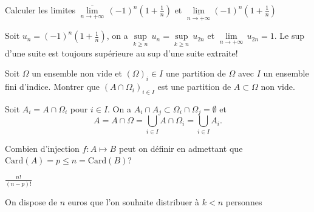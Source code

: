 \documentclass[11pt, answers]{exam}
\def \Z{\mathbb Z}
\newcommand{\RL}{\mathbb{R}}
\def \limsup{\underset{n\rightarrow+\infty}{\overline{\lim}}}
\def \liminf{\underset{n\rightarrow+\infty}{\underline{\lim}}}
\begin{document}
\begin{questions}
\question Calculer les limites  $\limsup\, (-1)^n\left(1+\frac{1}{n}\right)$ et $\liminf (-1)^n\left(1+\frac{1}{n}\right)$
\begin{solution}
Soit $u_n = (-1)^n\left(1+\frac{1}{n}\right)$, on a $\underset{k\geq n}{\sup}\,u_n  =\underset{k\geq n}{\sup}\,u_{2n}$ et $\underset{n\rightarrow +\infty}{\lim}\,u_{2n} = 1$. Le sup d'une suite est toujours supérieure au sup d'une suite extraite!
\end{solution}
\question Soit $\Omega$ un ensemble non vide et $(\Omega)_i\in I$ une partition de $\Omega$ avec $I$ un ensemble fini d'indice. Montrer que $(A\cap \Omega_i)_{i\in I}$ est une partition de $A\subset \Omega$ non vide. 
\begin{solution}
Soit $A_i = A\cap \Omega_i$ pour $i\in I$. On a $A_i\cap A_j\subset \Omega_i\cap \Omega_j = \emptyset$ et 
$$
A = A\cap\Omega = \bigcup_{i\in I}A\cap\Omega_i = \bigcup_{i\in I}A_i. 
$$
\end{solution}
\question Combien d'injection $f:A\mapsto B$ peut on définir en admettant que $\text{Card}(A) = p \leq n =\text{Card}(B)$? 
\begin{solution}
$\frac{n!}{(n-p)!}$
\end{solution}
\question On dispose de $n$ euros que l'on souhaite distribuer à $k < n$ personnes
\end{questions}
\end{document}
